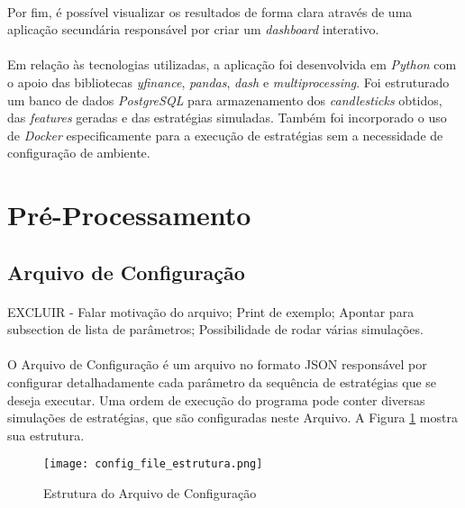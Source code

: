 \paragraph{} Por fim, é possível visualizar os resultados de forma clara através de uma aplicação secundária responsável por criar um \textit{dashboard} interativo.

\paragraph{} Em relação às tecnologias utilizadas, a aplicação foi desenvolvida em \textit{Python} com o apoio das bibliotecas \textit{yfinance}, \textit{pandas}, \textit{dash} e \textit{multiprocessing}. Foi estruturado um banco de dados \textit{PostgreSQL} para armazenamento dos \textit{candlesticks} obtidos, das \textit{features} geradas e das estratégias simuladas. Também foi incorporado o uso de \textit{Docker} especificamente para a execução de estratégias sem a necessidade de configuração de ambiente.

\section{Pré-Processamento}

\subsection{Arquivo de Configuração}
\paragraph{} EXCLUIR - Falar motivação do arquivo; Print de exemplo; Apontar para subsection de lista de parâmetros; Possibilidade de rodar várias simulações.

\paragraph{} O Arquivo de Configuração é um arquivo no formato JSON responsável por configurar detalhadamente cada parâmetro da sequência de estratégias que se deseja executar. Uma ordem de execução do programa pode conter diversas simulações de estratégias, que são configuradas neste Arquivo. A Figura \ref{fig:101} mostra sua estrutura.

\begin{figure}[h]
    \texttt{[image: config\_file\_estrutura.png]}
    \centering
    \caption{Estrutura do Arquivo de Configuração}
    \label{fig:101}
\end{figure}

